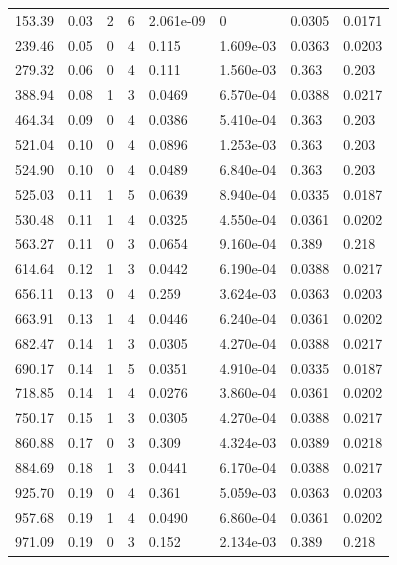 \documentclass[preview]{standalone}
\begin{document}
{{\begin{tabular}{L{1.2cm}C{1.2cm} C{0.3cm}C{0.5cm} C{1.4cm}C{1.4cm} C{1.4cm}C{1.4cm}}
  153.39  &  0.03  & 2     &  6 &  2.061e-09  & 0  & 0.0305 &  0.0171   \\ 
  239.46  &  0.05  & 0     &  4 &  0.115  & 1.609e-03  & 0.0363 &  0.0203   \\ 
  279.32  &  0.06  & 0     &  4 &  0.111  & 1.560e-03  & 0.363 &  0.203   \\ 
  388.94  &  0.08  & 1     &  3 &  0.0469  & 6.570e-04  & 0.0388 &  0.0217   \\ 
  464.34  &  0.09  & 0     &  4 &  0.0386  & 5.410e-04  & 0.363 &  0.203   \\ 
  521.04  &  0.10  & 0     &  4 &  0.0896  & 1.253e-03  & 0.363 &  0.203   \\ 
  524.90  &  0.10  & 0     &  4 &  0.0489  & 6.840e-04  & 0.363 &  0.203   \\ 
  525.03  &  0.11  & 1     &  5 &  0.0639  & 8.940e-04  & 0.0335 &  0.0187   \\ 
  530.48  &  0.11  & 1     &  4 &  0.0325  & 4.550e-04  & 0.0361 &  0.0202   \\ 
  563.27  &  0.11  & 0     &  3 &  0.0654  & 9.160e-04  & 0.389 &  0.218   \\ 
  614.64  &  0.12  & 1     &  3 &  0.0442  & 6.190e-04  & 0.0388 &  0.0217   \\ 
  656.11  &  0.13  & 0     &  4 &  0.259  & 3.624e-03  & 0.0363 &  0.0203   \\ 
  663.91  &  0.13  & 1     &  4 &  0.0446  & 6.240e-04  & 0.0361 &  0.0202   \\ 
  682.47  &  0.14  & 1     &  3 &  0.0305  & 4.270e-04  & 0.0388 &  0.0217   \\ 
  690.17  &  0.14  & 1     &  5 &  0.0351  & 4.910e-04  & 0.0335 &  0.0187   \\ 
  718.85  &  0.14  & 1     &  4 &  0.0276  & 3.860e-04  & 0.0361 &  0.0202   \\ 
  750.17  &  0.15  & 1     &  3 &  0.0305  & 4.270e-04  & 0.0388 &  0.0217   \\ 
  860.88  &  0.17  & 0     &  3 &  0.309  & 4.324e-03  & 0.0389 &  0.0218   \\ 
  884.69  &  0.18  & 1     &  3 &  0.0441  & 6.170e-04  & 0.0388 &  0.0217   \\ 
  925.70  &  0.19  & 0     &  4 &  0.361  & 5.059e-03  & 0.0363 &  0.0203   \\ 
  957.68  &  0.19  & 1     &  4 &  0.0490  & 6.860e-04  & 0.0361 &  0.0202   \\ 
  971.09  &  0.19  & 0     &  3 &  0.152  & 2.134e-03  & 0.389 &  0.218   \\ 

\end{tabular}}}
\end{document}
